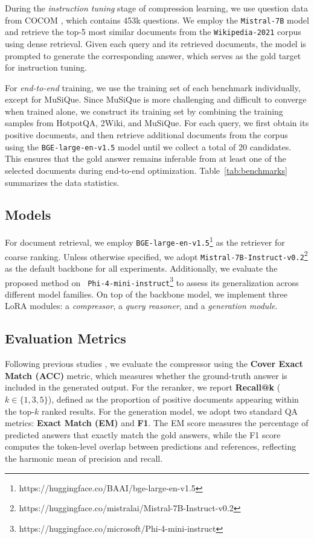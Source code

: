 \documentclass{applemlr}
\numberwithin{equation}{section}
\begin{document}
During the \textit{instruction tuning} stage of compression learning, we use question data from \textsc{COCOM} \citep{10.1145/3701551.3703527} , which contains 453k questions. We employ the \texttt{Mistral-7B} model and retrieve the top-5 most similar documents from the \texttt{Wikipedia-2021} corpus using dense retrieval. 
Given each query and its retrieved documents, the model is prompted to generate the corresponding answer, which serves as the gold target for instruction tuning.

For \textit{end-to-end} training, we use the training set of each benchmark individually, except for MuSiQue. 
Since MuSiQue is more challenging and difficult to converge when trained alone, we construct its training set by combining the training samples from HotpotQA, 2Wiki, and MuSiQue.
For each query, we first obtain its positive documents, and then retrieve additional documents from the corpus using the \texttt{BGE-large-en-v1.5} model until we collect a total of 20 candidates. 
This ensures that the gold answer remains inferable from at least one of the selected documents during end-to-end optimization. Table~\ref{tab:benchmarks} summarizes the data statistics.

\subsection{Models}
For document retrieval, we employ \texttt{BGE-large-en-v1.5}\footnote{https://huggingface.co/BAAI/bge-large-en-v1.5} as the retriever for coarse ranking. 
Unless otherwise specified, we adopt \texttt{Mistral-7B-Instruct-v0.2}\footnote{https://huggingface.co/mistralai/Mistral-7B-Instruct-v0.2} as the default backbone for all experiments. 
Additionally, we evaluate the proposed method on \texttt{
Phi-4-mini-instruct}\footnote{https://huggingface.co/microsoft/Phi-4-mini-instruct} to assess its generalization across different model families. 
On top of the backbone model, we implement three LoRA modules: a \textit{compressor}, a \textit{query reasoner}, and a \textit{generation module}.

\subsection{Evaluation Metrics}
Following previous studies \citep{10.5555/3737916.3741392,louis-etal-2025-pisco}, we evaluate the compressor using the \textbf{Cover Exact Match (ACC)} metric, which measures whether the ground-truth answer is included in the generated output. 
For the reranker, we report \textbf{Recall@k} ($k \in \{1,3,5\}$), defined as the proportion of positive documents appearing within the top-$k$ ranked results.
For the generation model, we adopt two standard QA metrics: \textbf{Exact Match (EM)} and \textbf{F1}. 
The EM score measures the percentage of predicted answers that exactly match the gold answers, while the F1 score computes the token-level overlap between predictions and references, reflecting the harmonic mean of precision and recall. 
\end{document}
